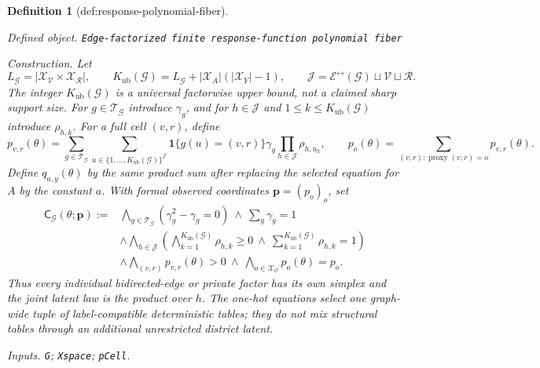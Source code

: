 \documentclass{article}
\newtheorem{definition}{Definition}
\begin{document}
\begin{definition}[def:response-polynomial-fiber]\label{def:response-polynomial-fiber}
\par\smallskip\noindent\emph{Defined object.} \texttt{Edge-\allowbreak{}factorized finite response-\allowbreak{}function polynomial fiber}
\par\smallskip\noindent\emph{Construction.} Let
\[
L_{\mathcal G}=\left|\mathcal X_{\mathcal V}\times\mathcal X_{\mathcal R}\right|,
\qquad
K_{\mathrm{ub}}(\mathcal G)=L_{\mathcal G}+|\mathcal X_A|(|\mathcal X_Y|-1),
\qquad
\mathcal J=\mathcal E^{\leftrightarrow}(\mathcal G)\sqcup\mathcal V\sqcup\mathcal R.
\]
The integer \(K_{\mathrm{ub}}(\mathcal G)\) is a universal factorwise upper bound, not a claimed sharp support size. For \(g\in\mathcal T_{\mathcal G}\) introduce \(\gamma_g\), and for \(h\in\mathcal J\) and \(1\leq k\leq K_{\mathrm{ub}}(\mathcal G)\) introduce \(\rho_{h,k}\). For a full cell \((v,r)\), define
\[
p_{v,r}(\theta)=
\sum_{g\in\mathcal T_{\mathcal G}}
\sum_{u\in\{1,\ldots,K_{\mathrm{ub}}(\mathcal G)\}^{\mathcal J}}
\mathbf 1\{g(u)=(v,r)\}\gamma_g\prod_{h\in\mathcal J}\rho_{h,u_h},
\qquad
p_o(\theta)=\sum_{(v,r):\operatorname{proxy}(v,r)=o}p_{v,r}(\theta).
\]
Define \(q_{a,y}(\theta)\) by the same product sum after replacing the selected equation for \(A\) by the constant \(a\). With formal observed coordinates \(\mathbf p=(p_o)_o\), set
\[
\begin{aligned}
\mathsf C_{\mathcal G}(\theta;\mathbf p):={}&
\bigwedge_{g\in\mathcal T_{\mathcal G}}(\gamma_g^2-\gamma_g=0)
\ \wedge\ \sum_g\gamma_g=1\\
&\wedge\bigwedge_{h\in\mathcal J}
\left(\bigwedge_{k=1}^{K_{\mathrm{ub}}(\mathcal G)}\rho_{h,k}\geq0
\ \wedge\ \sum_{k=1}^{K_{\mathrm{ub}}(\mathcal G)}\rho_{h,k}=1\right)\\
&\wedge\bigwedge_{(v,r)}p_{v,r}(\theta)>0
\ \wedge\ \bigwedge_{o\in\mathcal X_{\mathcal O}}p_o(\theta)=p_o.
\end{aligned}
\]
Thus every individual bidirected-edge or private factor has its own simplex and the joint latent law is the product over \(h\). The one-hot equations select one graph-wide tuple of label-compatible deterministic tables; they do not mix structural tables through an additional unrestricted district latent.
\par\smallskip\noindent\emph{Inputs.} \texttt{G}; \texttt{Xspace}; \texttt{pCell}.
\end{definition}
\end{document}
